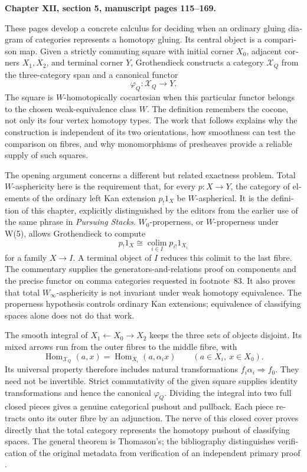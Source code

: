 \begin{otherlanguage}{english}
\noindent\textbf{Chapter XII, section 5, manuscript pages 115--169.}
\medskip

These pages develop a concrete calculus for deciding when an ordinary gluing diagram of categories represents a homotopy gluing. Its central object is a comparison map. Given a strictly commuting square with initial corner $X_0$, adjacent corners $X_1,X_2$, and terminal corner $Y$, Grothendieck constructs a category $\mathcal X_Q$ from the three-category span and a canonical functor
\[
                    \varphi_Q:\mathcal X_Q\longrightarrow Y.
\]
The square is $W$-homotopically cocartesian when this particular functor belongs to the chosen weak-equivalence class $W$. The definition remembers the cocone, not only its four vertex homotopy types. The work that follows explains why the construction is independent of its two orientations, how smoothness can test the comparison on fibres, and why monomorphisms of presheaves provide a reliable supply of such squares.

The opening argument concerns a different but related exactness problem. Total $W$-asphericity here is the requirement that, for every $p:X\to Y$, the category of elements of the ordinary left Kan extension $p_!1_X$ be $W$-aspherical. It is the definition of this chapter, explicitly distinguished by the editors from the earlier use of the same phrase in \emph{Pursuing Stacks}. $W_0$-properness, or $W$-properness under W(5), allows Grothendieck to compute
\[
 p_!1_X\cong\operatorname*{colim}_{i\in I}p_{i!}1_{X_i}
\]
for a family $X\to I$. A terminal object of $I$ reduces this colimit to the last fibre. The commentary supplies the generators-and-relations proof on components and the precise functor on comma categories requested in footnote~83. It also proves that total $W_\infty$-asphericity is not invariant under weak homotopy equivalence. The properness hypothesis controls ordinary Kan extensions; equivalence of classifying spaces alone does not do that work.

The smooth integral of $X_1\leftarrow X_0\to X_2$ keeps the three sets of objects disjoint. Its mixed arrows run from the outer fibres to the middle fibre, with
\[
 \operatorname{Hom}_{\mathcal X_Q}(a,x)
       =\operatorname{Hom}_{X_i}(a,\alpha_i x)
       \qquad(a\in X_i,\ x\in X_0).
\]
Its universal property therefore includes natural transformations $f_i\alpha_i\Rightarrow f_0$. They need not be invertible. Strict commutativity of the given square supplies identity transformations and hence the canonical $\varphi_Q$. Dividing the integral into two full closed pieces gives a genuine categorical pushout and pullback. Each piece retracts onto its outer fibre by an adjunction. The nerve of this closed cover proves directly that the total category represents the homotopy pushout of classifying spaces. The general theorem is Thomason's; the bibliography distinguishes verification of the original metadata from verification of an independent primary proof \citep{Thomason1979,Cegarra2020}.


\end{otherlanguage}
